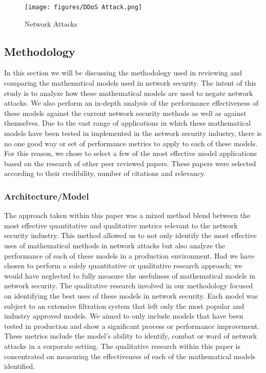 \documentclass{article}
\begin{document}
\begin{figure}
    \centering
    \texttt{[image: figures/DDoS Attack.png]}
    \caption{Network Attacks}
\end{figure}

\subsection{Methodology}
In this section we will be discussing the methodology used in reviewing and comparing the mathematical models used in network security. The intent of this study is to analyze how these mathematical models are used to negate network attacks. We also perform an in-depth analysis of the performance effectiveness of these models against the current network security methods as well as against themselves. Due to the vast range of applications in which these mathematical models have been tested in implemented in the network security industry, there is no one good way or set of performance metrics to apply to each of these models. For this reason, we chose to select a few of the most effective model applications based on the research of other peer reviewed papers. These papers were selected according to their credibility, number of citations and relevancy. 

\subsubsection{Architecture/Model}
The approach taken within this paper was a mixed method blend between the most effective quantitative and qualitative metrics relevant to the network security industry. This method allowed us to not only identify the most effective uses of mathematical methods in network attacks but also analyze the performance of each of these models in a production environment. Had we have chosen to perform a solely quantitative or qualitative research approach; we would have neglected to fully measure the usefulness of mathematical models in network security. The qualitative research involved in our methodology focused on identifying the best uses of these models in network security. Each model was subject to an extensive filtration system that left only the most popular and industry approved models. We aimed to only include models that have been tested in production and show a significant process or performance improvement. These metrics include the model’s ability to identify, combat or ward of network attacks in a corporate setting. The qualitative research within this paper is concentrated on measuring the effectiveness of each of the mathematical models identified. 
\end{document}
